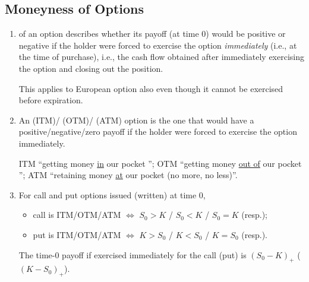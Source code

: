\subsection{Moneyness of Options}
\begin{enumerate}
\item {} of an option describes whether its payoff (at time 0)
would be positive or negative if the holder were forced to exercise
the option \emph{immediately} (i.e., at the time of purchase), i.e., the cash
flow obtained after immediately exercising the option and closing out the
position.
\begin{note}
This applies to European option also even though it cannot be exercised before
expiration.
\end{note}

\item An  (ITM)/
(OTM)/ (ATM) option is the one that would have a
positive/negative/zero payoff if the holder were forced to exercise the
option immediately.
\begin{mnemonic}
ITM  ``getting money \underline{in} our pocket ''; OTM
 ``getting money \underline{out of} our pocket '';
ATM  ``retaining money \underline{at} our pocket  (no more, no
less)''.
\end{mnemonic}

\item For call and put options issued (written) at time 0,
\begin{itemize}
\item call is ITM/OTM/ATM \(\iff\) \(S_0>K\) / \(S_0<K\) / \(S_0=K\) (resp.);
\item put is ITM/OTM/ATM \(\iff\) \(K>S_0\) / \(K<S_0\) / \(K=S_0\) (resp.).
\end{itemize}
\begin{note}
The time-0 payoff if exercised immediately for the call (put) is
\((S_0-K)_{+}\) (\((K-S_0)_{+}\)).
\end{note}
\end{enumerate}
